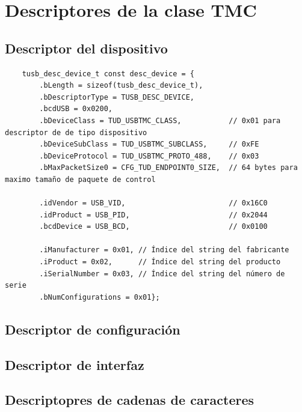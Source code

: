 \section{Descriptores de la clase TMC}


\subsection{Descriptor del dispositivo}
\begin{verbatim}
    tusb_desc_device_t const desc_device = {
        .bLength = sizeof(tusb_desc_device_t),
        .bDescriptorType = TUSB_DESC_DEVICE,
        .bcdUSB = 0x0200,
        .bDeviceClass = TUD_USBTMC_CLASS,           // 0x01 para descriptor de de tipo dispositivo
        .bDeviceSubClass = TUD_USBTMC_SUBCLASS,     // 0xFE
        .bDeviceProtocol = TUD_USBTMC_PROTO_488,    // 0x03
        .bMaxPacketSize0 = CFG_TUD_ENDPOINT0_SIZE,  // 64 bytes para maximo tamaño de paquete de control

        .idVendor = USB_VID,                        // 0x16C0
        .idProduct = USB_PID,                       // 0x2044
        .bcdDevice = USB_BCD,                       // 0x0100

        .iManufacturer = 0x01, // Índice del string del fabricante
        .iProduct = 0x02,      // Índice del string del producto
        .iSerialNumber = 0x03, // Índice del string del número de serie
        .bNumConfigurations = 0x01};
\end{verbatim}

\subsection{Descriptor de configuración}

\subsection{Descriptor de interfaz}
\subsection{Descriptopres de cadenas de caracteres}


